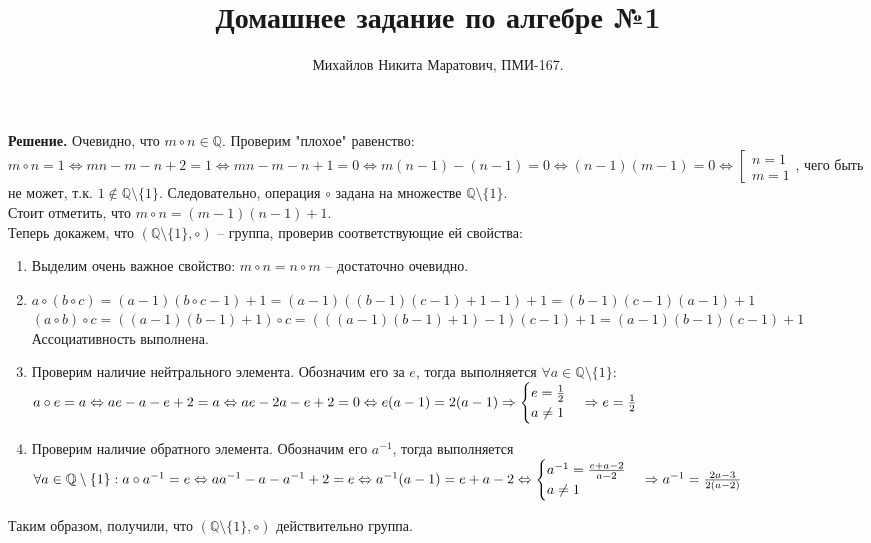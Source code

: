 \documentclass[14pt,a4paper]{scrartcl}
\title{
     Домашнее задание по алгебре №1\\
 }
\author{Михайлов Никита Маратович, ПМИ-167.\\
}
\date{}
\begin{document}
\maketitle
\begin{spacing}{1}

\begin{center}
\end{center}
\noindent \textbf{Решение. } Очевидно, что $m \circ n \in \mathbb{Q}$. Проверим "плохое" равенство: $m \circ n = 1 \Leftrightarrow mn - m - n + 2 = 1 \Leftrightarrow mn - m - n + 1 = 0 \Leftrightarrow m(n - 1) - (n - 1) = 0 \Leftrightarrow (n - 1)(m - 1) = 0 \Leftrightarrow 
\left[\begin{array}{l}
	 n = 1 \\
	 m = 1
\end{array}\right.$, чего быть не может, т.к. $1 \notin \mathbb{Q}\setminus\{1\}$. Следовательно, операция $\circ$ задана на множестве $\mathbb{Q} \setminus \{1\}$. \\
Стоит отметить, что $m \circ n = (m - 1)(n - 1) + 1$.\\
Теперь докажем, что $(\mathbb{Q}\setminus\{1\}, \circ)$ -- группа, проверив соответствующие ей свойства:
\begin{enumerate}
	\item Выделим очень важное свойство: $m \circ n = n \circ m$ -- достаточно очевидно.
	\item $ a \circ (b \circ c) = (a - 1)(b \circ c - 1) + 1 = (a - 1)((b - 1)(c - 1) + 1 - 1) + 1 = (b - 1)(c - 1)(a - 1) + 1$\\
	$(a \circ b) \circ c = ((a - 1)(b - 1) + 1)\circ c =  (((a - 1)(b - 1) + 1) - 1)(c - 1) + 1 = (a - 1)(b - 1)(c - 1) + 1$\\
	Ассоциативность выполнена.
	\item Проверим наличие нейтрального элемента. Обозначим его за $e$, тогда выполняется $\forall a \in \mathbb{Q}\setminus{\{1\}}$: $a \circ e = a \Leftrightarrow ae - a - e + 2 = a \Leftrightarrow  \\ ae - 2a - e + 2 = 0 \Leftrightarrow e(a - 1) = 2(a - 1) \Rightarrow 
	\begin{cases}
	e = \frac12\\
	a \neq 1
	\end{cases} \Rightarrow e = \frac12$
	\item Проверим наличие обратного элемента. Обозначим его $a^{-1}$, тогда выполняется $\forall a \in \mathbb{Q}\setminus\{1\}: a \circ a^{-1} = e \Leftrightarrow aa^{-1} - a - a^{-1} + 2 = e \Leftrightarrow \\ a^{-1}(a - 1) = e + a - 2 \Leftrightarrow
	\begin{cases}
	a^{-1} = \frac{e + a - 2}{a - 2}\\
	a \neq 1
	\end{cases} \Rightarrow a^{-1} = \frac{2a - 3}{2(a - 2)}$
\end{enumerate}
Таким образом, получили, что $(\mathbb{Q} \setminus{\{1\}}, \circ)$ действительно группа.

\end{spacing}
\end{document}
